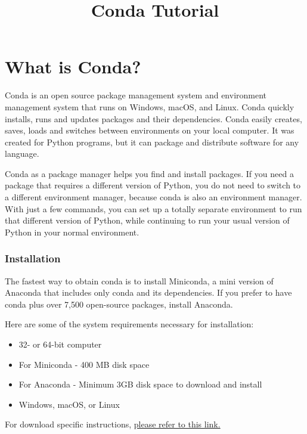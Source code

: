 \documentclass{article}
\begin{document}
\title{Conda Tutorial}
\date{}
\maketitle


\part*{What is Conda?}

Conda is an open source package management system and environment management system that runs on Windows, macOS, and Linux. Conda quickly installs, runs and updates packages and their dependencies. Conda easily creates, saves, loads and switches between environments on your local computer. It was created for Python programs, but it can package and distribute software for any language. 

Conda as a package manager helps you find and install packages. If you need a package that requires a different version of Python, you do not need to switch to a different environment manager, because conda is also an environment manager. With just a few commands, you can set up a totally separate environment to run that different version of Python, while continuing to run your usual version of Python in your normal environment.

\section{Installation}

The fastest way to obtain conda is to install Miniconda, a mini version of Anaconda that includes only conda and its dependencies. If you prefer to have conda plus over 7,500 open-source packages, install Anaconda.

Here are some of the system requirements necessary for installation:
\begin{itemize}
  \item 32- or 64-bit computer
  \item For Miniconda - 400 MB disk space
  \item For Anaconda - Minimum 3GB disk space to download and install
  \item Windows, macOS, or Linux
\end{itemize}

For download specific instructions, \href{https://docs.conda.io/projects/conda/en/latest/user-guide/install/index.html}{please refer to this link.}
\end{document}
